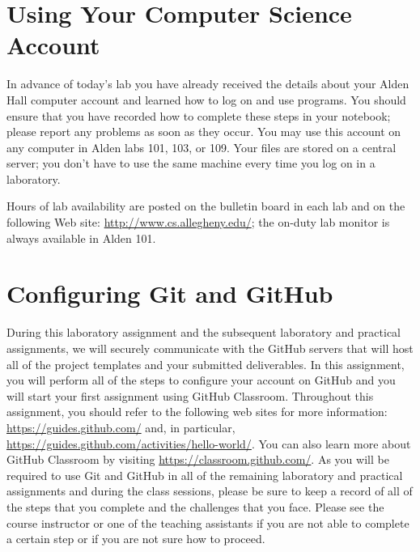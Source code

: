 \documentclass[11pt]{article}
\begin{document}
\section*{Using Your Computer Science Account}

In advance of today's lab you have already received the details about your Alden Hall computer account and learned how
to log on and use programs. You should ensure that you have recorded how to complete these steps in your notebook;
please report any problems as soon as they occur. You may use this account on any computer in Alden labs 101, 103, or
109. Your files are stored on a central server; you don't have to use the same machine every time you log on in a
laboratory.

Hours of lab availability are posted on the bulletin board in each lab and on the following Web site:
\url{http://www.cs.allegheny.edu/}; the on-duty lab monitor is always available in Alden 101.

\section*{Configuring Git and GitHub}

During this laboratory assignment and the subsequent laboratory and practical assignments, we will securely communicate
with the GitHub servers that will host all of the project templates and your submitted deliverables. In this assignment,
you will perform all of the steps to configure your account on GitHub and you will start your first assignment using
GitHub Classroom. Throughout this assignment, you should refer to the following web sites for more information:
\url{https://guides.github.com/} and, in particular, \url{https://guides.github.com/activities/hello-world/}. You can
also learn more about GitHub Classroom by visiting \url{https://classroom.github.com/}. As you will be required to use
Git and GitHub in all of the remaining laboratory and practical assignments and during the class sessions, please be
sure to keep a record of all of the steps that you complete and the challenges that you face. Please see the course
instructor or one of the teaching assistants if you are not able to complete a certain step or if you are not sure how
to proceed.
\end{document}
